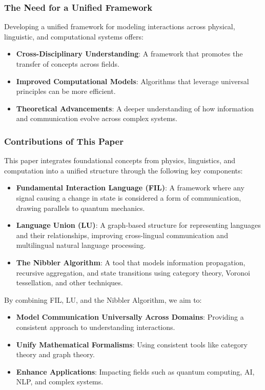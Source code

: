 \subsubsection{The Need for a Unified Framework}

Developing a unified framework for modeling interactions across physical, linguistic, and computational systems offers:

\begin{itemize}
    \item \textbf{Cross-Disciplinary Understanding}: A framework that promotes the transfer of concepts across fields.
    \item \textbf{Improved Computational Models}: Algorithms that leverage universal principles can be more efficient.
    \item \textbf{Theoretical Advancements}: A deeper understanding of how information and communication evolve across complex systems.
\end{itemize}

\subsubsection{Contributions of This Paper}

This paper integrates foundational concepts from physics, linguistics, and computation into a unified structure through the following key components:

\begin{itemize}
    \item \textbf{Fundamental Interaction Language (FIL)}: A framework where any signal causing a change in state is considered a form of communication, drawing parallels to quantum mechanics.
    \item \textbf{Language Union (LU)}: A graph-based structure for representing languages and their relationships, improving cross-lingual communication and multilingual natural language processing.
    \item \textbf{The Nibbler Algorithm}: A tool that models information propagation, recursive aggregation, and state transitions using category theory, Voronoi tessellation, and other techniques.
\end{itemize}

By combining FIL, LU, and the Nibbler Algorithm, we aim to:

\begin{itemize}
    \item \textbf{Model Communication Universally Across Domains}: Providing a consistent approach to understanding interactions.
    \item \textbf{Unify Mathematical Formalisms}: Using consistent tools like category theory and graph theory.
    \item \textbf{Enhance Applications}: Impacting fields such as quantum computing, AI, NLP, and complex systems.
\end{itemize}

